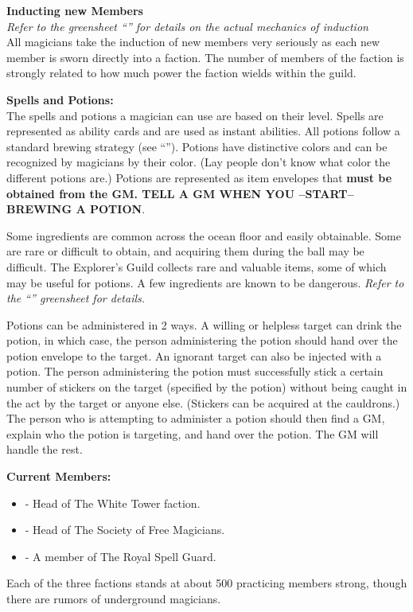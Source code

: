 \documentclass[blue]{NeptuneBall}
\begin{document}
{\bf Inducting new Members}\\
\emph{Refer to the greensheet ``\gInduction{}'' for details on the actual mechanics of induction} \\
All magicians take the induction of new members very seriously as each new member is sworn directly into a faction. The number of members of the faction is strongly related to how much power the faction wields within the guild.

{\bf Spells and Potions:}\\
The spells and potions a magician can use are based on their level. Spells are represented as ability cards and are used as instant abilities. All potions follow a standard brewing strategy (see ``\gPotions{}''). Potions have distinctive colors and can be recognized by magicians by their color.  (Lay people don't know what color the different potions are.) Potions are represented as item envelopes that {\bf must be obtained from the GM. TELL A GM WHEN YOU --START-- BREWING A POTION}.

Some ingredients are common across the ocean floor and easily obtainable. Some are rare or difficult to obtain, and acquiring them during the ball may be difficult. The Explorer's Guild collects rare and valuable items, some of which may be useful for potions. A few ingredients are known to be dangerous. \emph {Refer to the ``\gPotions{}'' greensheet for details.}

Potions can be administered in 2 ways. A willing or helpless target can drink the potion, in which case, the person administering the potion should hand over the potion envelope to the target. An ignorant target can also be injected with a potion. The person administering the potion must successfully stick a certain number of stickers on the target (specified by the potion) without being caught in the act by the target or anyone else. (Stickers can be acquired at the cauldrons.) The person who is attempting to administer a potion should then find a GM, explain who the potion is targeting, and hand over the potion. The GM will handle the rest.

{\bf Current Members:}
\begin{itemize}
\item \cManta{} - Head of The White Tower faction.
\item \cWitch{\MYname} - Head of The Society of Free Magicians.
\item \cBodyguard{} - A member of The Royal Spell Guard.
\end{itemize}

\begin{itemz}[Trivia]
	\item Each of the three factions stands at about 500 practicing members strong, though there are rumors of underground magicians.
\end{itemz}
\end{document}
